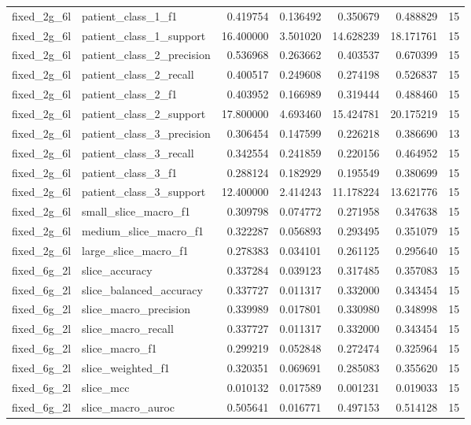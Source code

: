 \begin{tabular}{llrrrrr}
fixed_2g_6l & patient_class_1_f1 & 0.419754 & 0.136492 & 0.350679 & 0.488829 & 15 \\
fixed_2g_6l & patient_class_1_support & 16.400000 & 3.501020 & 14.628239 & 18.171761 & 15 \\
fixed_2g_6l & patient_class_2_precision & 0.536968 & 0.263662 & 0.403537 & 0.670399 & 15 \\
fixed_2g_6l & patient_class_2_recall & 0.400517 & 0.249608 & 0.274198 & 0.526837 & 15 \\
fixed_2g_6l & patient_class_2_f1 & 0.403952 & 0.166989 & 0.319444 & 0.488460 & 15 \\
fixed_2g_6l & patient_class_2_support & 17.800000 & 4.693460 & 15.424781 & 20.175219 & 15 \\
fixed_2g_6l & patient_class_3_precision & 0.306454 & 0.147599 & 0.226218 & 0.386690 & 13 \\
fixed_2g_6l & patient_class_3_recall & 0.342554 & 0.241859 & 0.220156 & 0.464952 & 15 \\
fixed_2g_6l & patient_class_3_f1 & 0.288124 & 0.182929 & 0.195549 & 0.380699 & 15 \\
fixed_2g_6l & patient_class_3_support & 12.400000 & 2.414243 & 11.178224 & 13.621776 & 15 \\
fixed_2g_6l & small_slice_macro_f1 & 0.309798 & 0.074772 & 0.271958 & 0.347638 & 15 \\
fixed_2g_6l & medium_slice_macro_f1 & 0.322287 & 0.056893 & 0.293495 & 0.351079 & 15 \\
fixed_2g_6l & large_slice_macro_f1 & 0.278383 & 0.034101 & 0.261125 & 0.295640 & 15 \\
fixed_6g_2l & slice_accuracy & 0.337284 & 0.039123 & 0.317485 & 0.357083 & 15 \\
fixed_6g_2l & slice_balanced_accuracy & 0.337727 & 0.011317 & 0.332000 & 0.343454 & 15 \\
fixed_6g_2l & slice_macro_precision & 0.339989 & 0.017801 & 0.330980 & 0.348998 & 15 \\
fixed_6g_2l & slice_macro_recall & 0.337727 & 0.011317 & 0.332000 & 0.343454 & 15 \\
fixed_6g_2l & slice_macro_f1 & 0.299219 & 0.052848 & 0.272474 & 0.325964 & 15 \\
fixed_6g_2l & slice_weighted_f1 & 0.320351 & 0.069691 & 0.285083 & 0.355620 & 15 \\
fixed_6g_2l & slice_mcc & 0.010132 & 0.017589 & 0.001231 & 0.019033 & 15 \\
fixed_6g_2l & slice_macro_auroc & 0.505641 & 0.016771 & 0.497153 & 0.514128 & 15 \\

\end{tabular}
